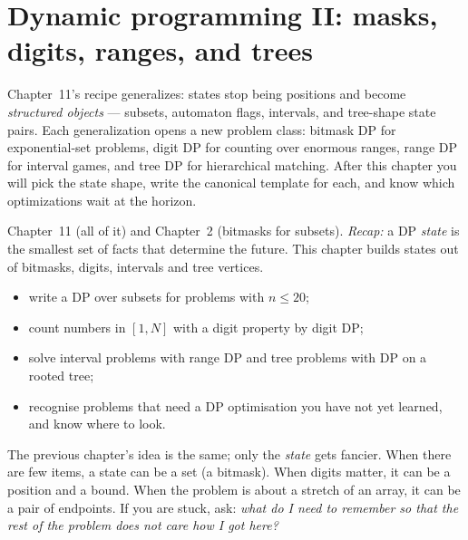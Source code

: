 \chapter{Dynamic programming II: masks, digits, ranges, and trees}\label{ch:dp2}

Chapter~11's recipe generalizes: states stop being positions and
become \emph{structured objects} --- subsets, automaton flags,
intervals, and tree-shape state pairs. Each generalization opens a
new problem class: bitmask DP for exponential-set problems, digit DP
for counting over enormous ranges, range DP for interval games, and
tree DP for hierarchical matching. After this chapter you will pick
the state shape, write the canonical template for each, and know
which optimizations wait at the horizon.

\begin{rulebox}
Chapter~11 (all of it) and Chapter~2 (bitmasks for subsets). \emph{Recap:} a DP \emph{state} is the smallest set of facts that determine the future. This chapter builds states out of bitmasks, digits, intervals and tree vertices.
\end{rulebox}
\begin{wins}
\begin{itemize}
\item write a DP over subsets for problems with $n\le 20$;
\item count numbers in $[1,N]$ with a digit property by digit DP;
\item solve interval problems with range DP and tree problems with DP on a rooted tree;
\item recognise problems that need a DP optimisation you have not yet learned, and know where to look.
\end{itemize}
\end{wins}
\begin{principle}
The previous chapter's idea is the same; only the \emph{state} gets fancier. When there are few items, a state can be a set (a bitmask). When digits matter, it can be a position and a bound. When the problem is about a stretch of an array, it can be a pair of endpoints. If you are stuck, ask: \emph{what do I need to remember so that the rest of the problem does not care how I got here?}
\end{principle}

